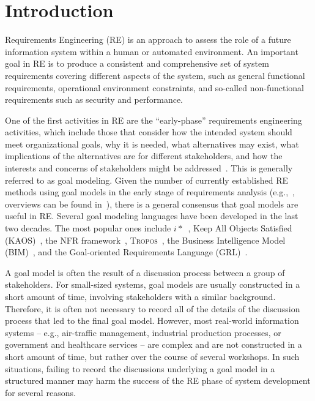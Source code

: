 \section{Introduction}
\label{sect:introduction}

Requirements Engineering (RE) is an approach to assess the role of a future information system within a human or automated environment. An important goal in RE is to produce a consistent and comprehensive set of system requirements covering different aspects of the system, such as general functional requirements, operational environment constraints, and so-called non-functional requirements such as security and performance. 

One of the first activities in RE are the ``early-phase'' requirements engineering activities, which include those that consider how the intended system should meet organizational goals, why it is needed, what alternatives may exist, what implications of the alternatives are for different stakeholders, and how the interests and concerns of stakeholders might be addressed~\cite{yu1997towards}. This is generally referred to as goal modeling. Given the number of currently established RE methods using goal models in the early stage of requirements analysis (e.g.,~\cite{liu2004designing,donzelli2004goal,dardenne1993goal,chung2012non,castro2002towards}, overviews can be found in~\cite{van2001goal,kavakliL05}), there is a general consensus that goal models are useful in RE. Several goal modeling languages have been developed in the last two decades. The most popular ones include $i*$~\cite{Yu:1997:TMR:827255.827807}, Keep All Objects Satisfied (KAOS)~\cite{van2008requirements}, the NFR framework~\cite{chung2012non}, \textsc{Tropos}~\cite{giorgini2005goal}, the Business Intelligence Model (BIM)~\cite{horkoff2014strategic}, and the Goal-oriented Requirements Language (GRL)~\cite{Amyot:2010:EGM:1841349.1841356}.

A goal model is often the result of a discussion process between a group of stakeholders. For small-sized systems, goal models are usually constructed in a short amount of time, involving stakeholders with a similar background. Therefore, it is often not necessary to record all of the details of the discussion process that led to the final goal model. 
However, most real-world information systems -- e.g., air-traffic management, industrial production processes, or government and healthcare services -- are complex and are not constructed in a short amount of time, but rather over the course of several workshops. In such situations, failing to record the discussions underlying a goal model in a structured manner may harm the success of the RE phase of system development for several reasons. 

